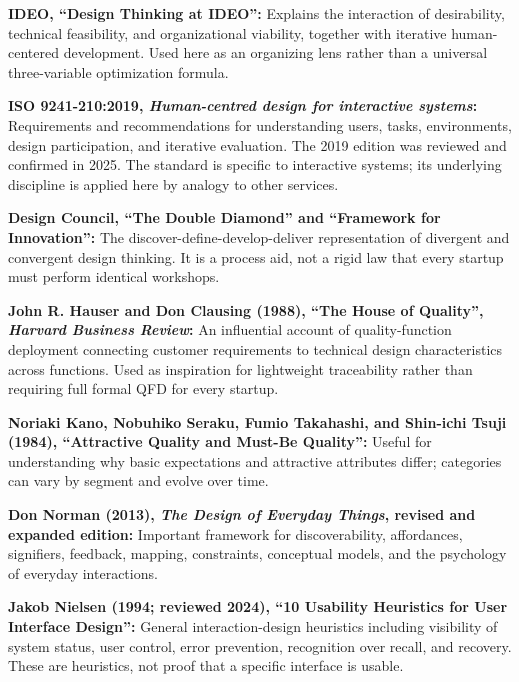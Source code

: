 \begin{enumerate}[leftmargin=*, label={[\textbf{R\arabic*}]}]
\item \textbf{IDEO, ``Design Thinking at IDEO'':} Explains the interaction of desirability, technical feasibility, and organizational viability, together with iterative human-centered development. Used here as an organizing lens rather than a universal three-variable optimization formula.

\item \textbf{ISO 9241-210:2019, \emph{Human-centred design for interactive systems}:} Requirements and recommendations for understanding users, tasks, environments, design participation, and iterative evaluation. The 2019 edition was reviewed and confirmed in 2025. The standard is specific to interactive systems; its underlying discipline is applied here by analogy to other services.

\item \textbf{Design Council, ``The Double Diamond'' and ``Framework for Innovation'':} The discover-define-develop-deliver representation of divergent and convergent design thinking. It is a process aid, not a rigid law that every startup must perform identical workshops.

\item \textbf{John R. Hauser and Don Clausing (1988), ``The House of Quality'', \emph{Harvard Business Review}:} An influential account of quality-function deployment connecting customer requirements to technical design characteristics across functions. Used as inspiration for lightweight traceability rather than requiring full formal QFD for every startup.

\item \textbf{Noriaki Kano, Nobuhiko Seraku, Fumio Takahashi, and Shin-ichi Tsuji (1984), ``Attractive Quality and Must-Be Quality'':} Useful for understanding why basic expectations and attractive attributes differ; categories can vary by segment and evolve over time.

\item \textbf{Don Norman (2013), \emph{The Design of Everyday Things}, revised and expanded edition:} Important framework for discoverability, affordances, signifiers, feedback, mapping, constraints, conceptual models, and the psychology of everyday interactions.

\item \textbf{Jakob Nielsen (1994; reviewed 2024), ``10 Usability Heuristics for User Interface Design'':} General interaction-design heuristics including visibility of system status, user control, error prevention, recognition over recall, and recovery. These are heuristics, not proof that a specific interface is usable.


\end{enumerate}
